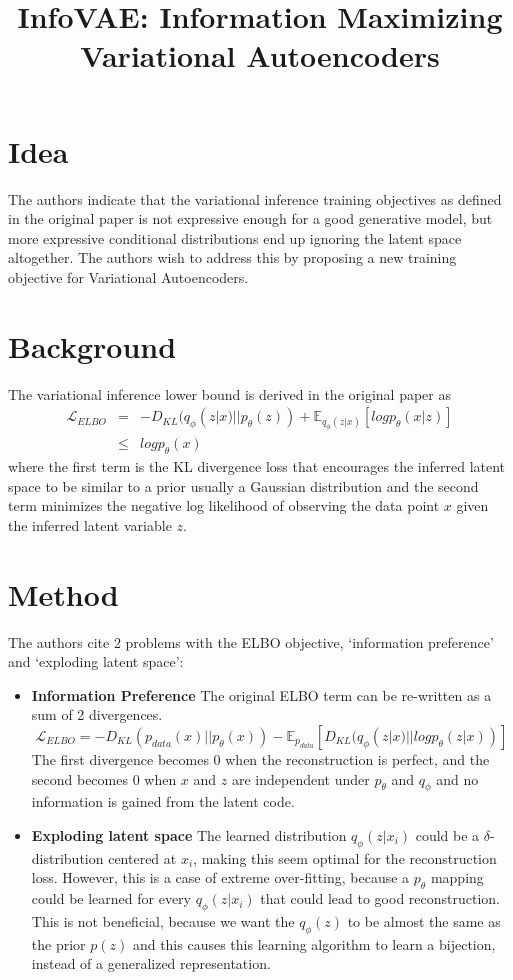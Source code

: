 \documentclass[12pt]{article}
\begin{document}
\title{InfoVAE: Information Maximizing Variational Autoencoders}
\author{}
\date{}
\maketitle

\section{Idea}
  The authors indicate that the variational inference training objectives as defined in the original paper \cite{kingma2013auto} is not expressive enough for a good generative model, but more expressive conditional distributions end up ignoring the latent space altogether. The authors wish to address this by proposing a new training objective for Variational Autoencoders.

\section{Background}
  The variational inference lower bound is derived in the original paper as 
  \begin{eqnarray*}
    \mathcal{L}_{ELBO} 
      &=& - D_{KL}(q_{\phi}(z|x) || p_{\theta}(z)) + \mathbb{E}_{q_{\phi}(z|x)} [log p_{\theta}(x|z)] \\
      &\leq& log p_{\theta}(x)
  \end{eqnarray*}
  where the first term is the KL divergence loss that encourages the inferred latent space to be similar to a prior usually a Gaussian distribution and the second term minimizes the negative log likelihood of observing the data point $x$ given the inferred latent variable $z$.

\section{Method}
  The authors cite 2 problems with the ELBO objective, `information preference' and `exploding latent space':
  \begin{itemize}
    \item \textbf{Information Preference} The original ELBO term can be re-written as a sum of 2 divergences. $$\mathcal{L}_{ELBO} = - D_{KL}(p_{data}(x) || p_{\theta}(x)) - \mathbb{E}_{p_{data}}[D_{KL}(q_{\phi}(z|x) || log p_{\theta}(z|x))]$$ The first divergence becomes 0 when the reconstruction is perfect, and the second becomes 0 when $x$ and $z$ are independent under $p_{\theta}$ and $q_{\phi}$ and no information is gained from the latent code.
    \item \textbf{Exploding latent space}
      The learned distribution $q_{\phi}(z|x_i)$ could be a $\delta$-distribution centered at $x_i$, making this seem optimal for the reconstruction loss. However, this is a case of extreme over-fitting, because a $p_{\theta}$ mapping could be learned for every $q_{\phi}(z|x_i)$ that could lead to good reconstruction. This is not beneficial, because we want the $q_{\phi}(z)$ to be almost the same as the prior $p(z)$ and this causes this learning algorithm to learn a bijection, instead of a generalized representation.
  \end{itemize}
\end{document}
